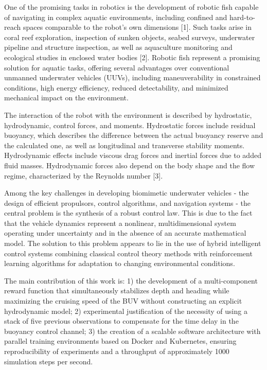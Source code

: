\documentclass[12pt]{revtex4}
\begin{document}
One of the promising tasks in robotics is the development of robotic fish capable of navigating in complex aquatic environments, including confined and hard-to-reach spaces comparable to the robot's own dimensions [1]. Such tasks arise in coral reef exploration, inspection of sunken objects, seabed surveys, underwater pipeline and structure inspection, as well as aquaculture monitoring and ecological studies in enclosed water bodies [2]. Robotic fish represent a promising solution for aquatic tasks, offering several advantages over conventional unmanned underwater vehicles (UUVs), including maneuverability in constrained conditions, high energy efficiency, reduced detectability, and minimized mechanical impact on the environment.

The interaction of the robot with the environment is described by hydrostatic, hydrodynamic, control forces, and moments. Hydrostatic forces include residual buoyancy, which describes the difference between the actual buoyancy reserve and the calculated one, as well as longitudinal and transverse stability moments. Hydrodynamic effects include viscous drag forces and inertial forces due to added fluid masses. Hydrodynamic forces also depend on the body shape and the flow regime, characterized by the Reynolds number [3].

Among the key challenges in developing biomimetic underwater vehicles - the design of efficient propulsors, control algorithms, and navigation systems - the central problem is the synthesis of a robust control law. This is due to the fact that the vehicle dynamics represent a nonlinear, multidimensional system operating under uncertainty and in the absence of an accurate mathematical model. The solution to this problem appears to lie in the use of hybrid intelligent control systems combining classical control theory methods with reinforcement learning algorithms for adaptation to changing environmental conditions.

The main contribution of this work is: 1) the development of a multi-component reward function that simultaneously stabilizes depth and heading while maximizing the cruising speed of the BUV without constructing an explicit hydrodynamic model; 2) experimental justification of the necessity of using a stack of five previous observations to compensate for the time delay in the buoyancy control channel; 3) the creation of a scalable software architecture with parallel training environments based on Docker and Kubernetes, ensuring reproducibility of experiments and a throughput of approximately 1000 simulation steps per second.
\end{document}
